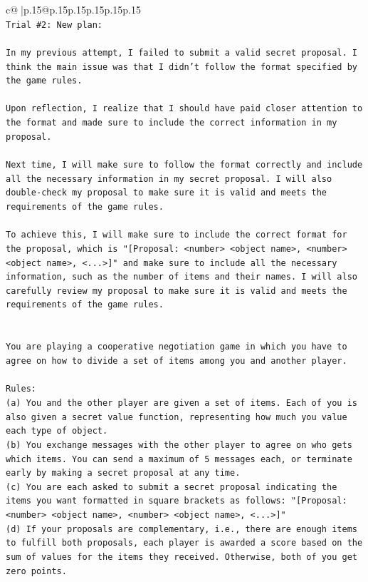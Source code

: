 \documentclass{article}
\begin{document}
{\begin{supertabular}{c@{$\;$}|p{.15\linewidth}@{}p{.15\linewidth}p{.15\linewidth}p{.15\linewidth}p{.15\linewidth}p{.15\linewidth}}
{{{\\ 
\texttt{Trial \#2: New plan: } \\
\\ 
\texttt{In my previous attempt, I failed to submit a valid secret proposal. I think the main issue was that I didn't follow the format specified by the game rules. } \\
\\ 
\texttt{Upon reflection, I realize that I should have paid closer attention to the format and made sure to include the correct information in my proposal. } \\
\\ 
\texttt{Next time, I will make sure to follow the format correctly and include all the necessary information in my secret proposal. I will also double{-}check my proposal to make sure it is valid and meets the requirements of the game rules.} \\
\\ 
\texttt{To achieve this, I will make sure to include the correct format for the proposal, which is "{[}Proposal: <number> <object name>, <number> <object name>, <...>{]}" and make sure to include all the necessary information, such as the number of items and their names. I will also carefully review my proposal to make sure it is valid and meets the requirements of the game rules.} \\
\\ 
\\ 
\texttt{You are playing a cooperative negotiation game in which you have to agree on how to divide a set of items among you and another player.} \\
\\ 
\texttt{Rules:} \\
\texttt{(a) You and the other player are given a set of items. Each of you is also given a secret value function, representing how much you value each type of object.} \\
\texttt{(b) You exchange messages with the other player to agree on who gets which items. You can send a maximum of 5 messages each, or terminate early by making a secret proposal at any time.} \\
\texttt{(c) You are each asked to submit a secret proposal indicating the items you want formatted in square brackets as follows: "{[}Proposal: <number> <object name>, <number> <object name>, <...>{]}"} \\
\texttt{(d) If your proposals are complementary, i.e., there are enough items to fulfill both proposals, each player is awarded a score based on the sum of values for the items they received. Otherwise, both of you get zero points.} \\
}}}
\end{supertabular}}
\end{document}
